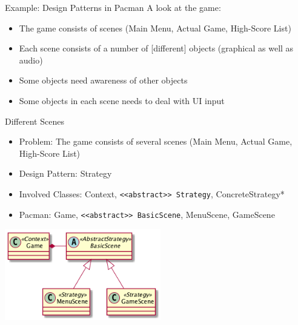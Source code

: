 \documentclass[10pt,t,a4paper]{beamer}
\begin{document}
\begin{frame}[label={sec:orgheadline3}]{Example: Design Patterns in Pacman}
A look at the game:

\begin{itemize}
\item The game consists of scenes (Main Menu, Actual Game, High-Score List)
\item Each scene consists of a number of [different] objects (graphical as well as audio)
\item Some objects need awareness of other objects
\item Some objects in each scene needs to deal with UI input
\end{itemize}
\end{frame}

\begin{frame}[fragile,label={sec:orgheadline4}]{Different Scenes}
 \begin{itemize}
\item Problem: The game consists of several scenes (Main Menu, Actual Game, High-Score List)
\item Design Pattern: Strategy
\item Involved Classes: Context, \texttt{<<abstract>> Strategy}, ConcreteStrategy*
\item Pacman: Game, \texttt{<<abstract>> BasicScene}, MenuScene, GameScene
\end{itemize}

\includegraphics[height=4cm]{FPM_Scenes.png}
\end{frame}
\end{document}
